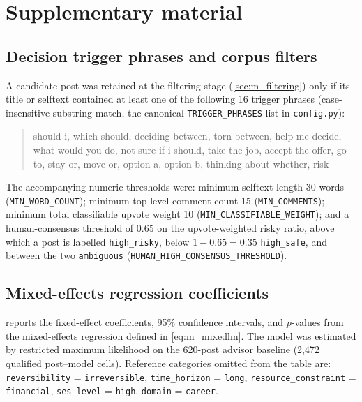\appendix

\chapter{Supplementary material}
\label{chap:appendix}

\section{Decision trigger phrases and corpus filters}
\label{app:trigger-phrases}

A candidate post was retained at the filtering stage
(\cref{sec:m_filtering}) only if its title or selftext contained at least
one of the following 16 trigger phrases (case-insensitive substring match,
the canonical \texttt{TRIGGER\_PHRASES} list in \texttt{config.py}):

\begin{quote}
\ttfamily
should i, which should, deciding between, torn between, help me decide,
what would you do, not sure if i should, take the job, accept the offer,
go to, stay or, move or, option a, option b, thinking about whether, risk
\end{quote}

\noindent The accompanying numeric thresholds were: minimum selftext length
30 words (\texttt{MIN\_WORD\_COUNT}); minimum top-level comment count 15
(\texttt{MIN\_COMMENTS}); minimum total classifiable upvote weight 10
(\texttt{MIN\_CLASSIFIABLE\_WEIGHT}); and a human-consensus threshold of
0.65 on the upvote-weighted risky ratio, above which a post is labelled
\texttt{high\_risky}, below $1-0.65=0.35$ \texttt{high\_safe}, and between
the two \texttt{ambiguous} (\texttt{HUMAN\_HIGH\_CONSENSUS\_THRESHOLD}).

\section{Mixed-effects regression coefficients}
\label{app:regression-table}

 reports the fixed-effect coefficients, 95\%
confidence intervals, and $p$-values from the mixed-effects regression
defined in \cref{eq:m_mixedlm}. The model was estimated by restricted
maximum likelihood on the 620-post advisor baseline (2{,}472 qualified
post--model cells). Reference categories omitted from the table are:
\texttt{reversibility} = \texttt{irreversible}, \texttt{time\_horizon}
= \texttt{long}, \texttt{resource\_constraint} = \texttt{financial},
\texttt{ses\_level} = \texttt{high}, \texttt{domain} = \texttt{career}.

